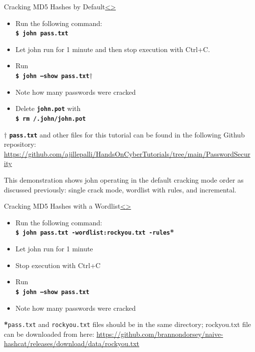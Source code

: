 \documentclass[12pt]{extarticle}
\newcommand{\code}[1]{\texttt{\bfseries#1}}
\newenvironment{instructionblock}{\Large\bgroup}{\egroup}
\begin{document}
	\pagebreak
	\begin{slide}{Cracking MD5 Hashes by Default}{\hyperref[slide 9]{\textless}\hyperref[slide 11]{\textgreater}}
		
		\begin{instructionblock}
			\begin{itemize}
				\item Run the following command:\\
				\code{\$ john pass.txt}
				\item Let john run for 1 minute and then stop execution with Ctrl+C.
				\item Run \\ \code{\$ john --show pass.txt{\textbf{$\dagger$}}}
				\item Note how many passwords were cracked
				\item Delete \code{john.pot} with\\
				\code{\$ rm \texttildelow/.john/john.pot}
			\end{itemize}
		\end{instructionblock}
	\end{slide}
	\textbf{$\dagger$} {\code{pass.txt} and other files for this tutorial can be found in the following Github repository: \url{https://github.com/ajillepalli/HandsOnCyberTutorials/tree/main/PasswordSecurity}}\\ 
	
	\vfill
	
	This demonstration shows john operating in the default cracking mode order as discussed previously: single crack mode, wordlist with rules, and incremental.
	
	\pagebreak
	\begin{slide}{Cracking MD5 Hashes with a Wordlist}{\hyperref[slide 10]{\textless}\hyperref[slide 12]{\textgreater}}
		\vskip 10pt
		\begin{instructionblock}
			\begin{itemize}
				\item Run the following command:\\
				\code{\$ john pass.txt -wordlist:rockyou.txt -rules}\textbf{*}
				\item Let john run for 1 minute
				\item Stop execution with Ctrl+C
				\item Run \\
				\code{\$ john --show pass.txt}
				\item Note how many passwords were cracked
			\end{itemize}
		\end{instructionblock}
	\end{slide}
	\textbf{*}\texttt{pass.txt} and \texttt{rockyou.txt} files should be in the same directory; rockyou.txt file can be downloaded from here: {\url{https://github.com/brannondorsey/naive-hashcat/releases/download/data/rockyou.txt}}
	\vfill
	
\end{document}
